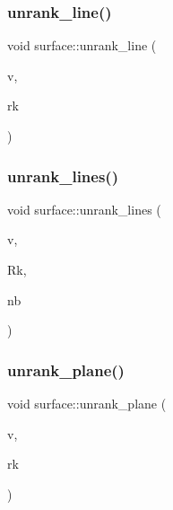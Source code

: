 \mbox{\label{classsurface_ade50f5b8b4ca454e83f7dc04bd87e456}} 
\subsubsection{\texorpdfstring{unrank\+\_\+line()}{unrank\_line()}}
{\footnotesize\ttfamily void surface\+::unrank\+\_\+line (\begin{DoxyParamCaption}\item[{\mbox{\hyperlink{galois_8h_a09fddde158a3a20bd2dcadb609de11dc}{I\+NT}} $\ast$}]{v,  }\item[{\mbox{\hyperlink{galois_8h_a09fddde158a3a20bd2dcadb609de11dc}{I\+NT}}}]{rk }\end{DoxyParamCaption})}

\mbox{\label{classsurface_abd11ba9db0eefe9502870877dab699c6}} 
\subsubsection{\texorpdfstring{unrank\+\_\+lines()}{unrank\_lines()}}
{\footnotesize\ttfamily void surface\+::unrank\+\_\+lines (\begin{DoxyParamCaption}\item[{\mbox{\hyperlink{galois_8h_a09fddde158a3a20bd2dcadb609de11dc}{I\+NT}} $\ast$}]{v,  }\item[{\mbox{\hyperlink{galois_8h_a09fddde158a3a20bd2dcadb609de11dc}{I\+NT}} $\ast$}]{Rk,  }\item[{\mbox{\hyperlink{galois_8h_a09fddde158a3a20bd2dcadb609de11dc}{I\+NT}}}]{nb }\end{DoxyParamCaption})}

\mbox{\label{classsurface_a3c4983538ccf54ee3dda464f5c12536b}} 
\subsubsection{\texorpdfstring{unrank\+\_\+plane()}{unrank\_plane()}}
{\footnotesize\ttfamily void surface\+::unrank\+\_\+plane (\begin{DoxyParamCaption}\item[{\mbox{\hyperlink{galois_8h_a09fddde158a3a20bd2dcadb609de11dc}{I\+NT}} $\ast$}]{v,  }\item[{\mbox{\hyperlink{galois_8h_a09fddde158a3a20bd2dcadb609de11dc}{I\+NT}}}]{rk }\end{DoxyParamCaption})}

